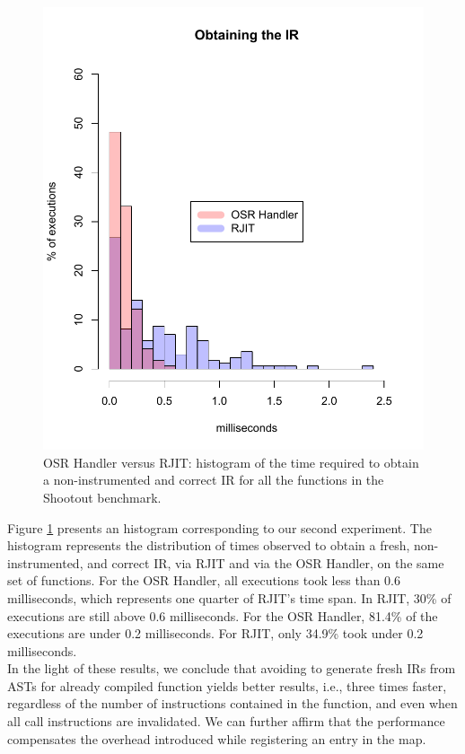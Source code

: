 \begin{figure}[h]
    \includegraphics[scale=0.9]{Figures/withoutJitAll2}
    \caption{OSR Handler versus RJIT: histogram of the time required to obtain a non-instrumented and correct IR for all the functions in the Shootout benchmark.}
    \label{fig:withoutJitAll}
\end{figure}

Figure \ref{fig:withoutJitAll} presents an histogram corresponding to our second experiment.
The histogram represents the distribution of times observed to obtain a fresh, non-instrumented, and correct IR, via RJIT and via the OSR Handler, on the same set of functions.
For the OSR Handler, all executions took less than 0.6 milliseconds, which represents one quarter of RJIT's time span.
In RJIT, 30\% of executions are still above 0.6 milliseconds.
For the OSR Handler, 81.4\% of the executions are under 0.2 milliseconds.
For RJIT, only 34.9\% took under 0.2 milliseconds.\\

In the light of these results, we conclude that avoiding to generate fresh IRs from ASTs for already compiled function yields better results, i.e., three times faster, regardless of the number of instructions contained in the function, and even when all call instructions are invalidated.
We can further affirm that the  performance compensates the overhead introduced while registering an entry in the  map.\\


